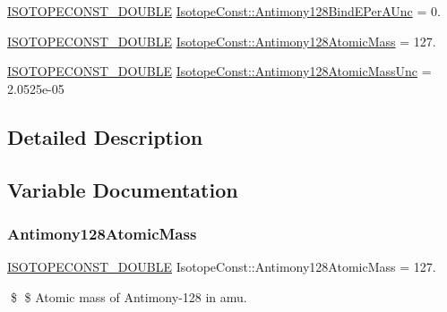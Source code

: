 \begin{DoxyCompactItemize}
\mbox{\hyperlink{group___isotope_const-_macros_ga8f45a7272ce02c0b4c65c44636ed719a}{I\+S\+O\+T\+O\+P\+E\+C\+O\+N\+S\+T\+\_\+\+D\+O\+U\+B\+LE}} \mbox{\hyperlink{group___isotope_const-_antimony-_sb128_ga2fa151cd8be979c18662233d6a64828f}{Isotope\+Const\+::\+Antimony128\+Bind\+E\+Per\+A\+Unc}} = 0.
\item 
\mbox{\hyperlink{group___isotope_const-_macros_ga8f45a7272ce02c0b4c65c44636ed719a}{I\+S\+O\+T\+O\+P\+E\+C\+O\+N\+S\+T\+\_\+\+D\+O\+U\+B\+LE}} \mbox{\hyperlink{group___isotope_const-_antimony-_sb128_gad1c83c3124f29b794006a8ec142491fa}{Isotope\+Const\+::\+Antimony128\+Atomic\+Mass}} = 127.
\item 
\mbox{\hyperlink{group___isotope_const-_macros_ga8f45a7272ce02c0b4c65c44636ed719a}{I\+S\+O\+T\+O\+P\+E\+C\+O\+N\+S\+T\+\_\+\+D\+O\+U\+B\+LE}} \mbox{\hyperlink{group___isotope_const-_antimony-_sb128_gaa05eb88d364c93d536583dfbc22587fe}{Isotope\+Const\+::\+Antimony128\+Atomic\+Mass\+Unc}} = 2.\+0525e-\/05
\end{DoxyCompactItemize}


\subsection{Detailed Description}


\subsection{Variable Documentation}
\mbox{\label{group___isotope_const-_antimony-_sb128_gad1c83c3124f29b794006a8ec142491fa}} 
\subsubsection{\texorpdfstring{Antimony128\+Atomic\+Mass}{Antimony128AtomicMass}}
{\footnotesize\ttfamily \mbox{\hyperlink{group___isotope_const-_macros_ga8f45a7272ce02c0b4c65c44636ed719a}{I\+S\+O\+T\+O\+P\+E\+C\+O\+N\+S\+T\+\_\+\+D\+O\+U\+B\+LE}} Isotope\+Const\+::\+Antimony128\+Atomic\+Mass = 127.}

\$ \$ Atomic mass of Antimony-\/128 in amu. \mbox{\label{group___isotope_const-_antimony-_sb128_gaa05eb88d364c93d536583dfbc22587fe}} 
